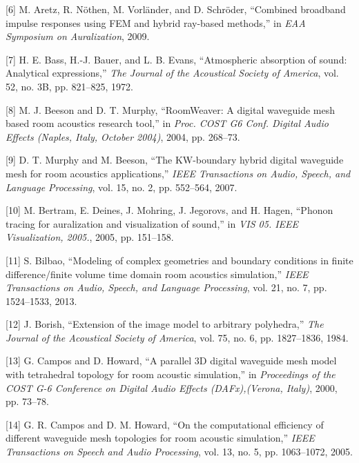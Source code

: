 \documentclass[]{scrreprt}
\begin{document}
\hypertarget{ref-aretzux5fcombinedux5f2009}{}
{[}6{]} M. Aretz, R. Nöthen, M. Vorländer, and D. Schröder, ``Combined
broadband impulse responses using FEM and hybrid ray-based methods,'' in
\emph{EAA Symposium on Auralization}, 2009.

\hypertarget{ref-bassux5fatmosphericux5f1972}{}
{[}7{]} H. E. Bass, H.-J. Bauer, and L. B. Evans, ``Atmospheric
absorption of sound: Analytical expressions,'' \emph{The Journal of the
Acoustical Society of America}, vol. 52, no. 3B, pp. 821--825, 1972.

\hypertarget{ref-beesonux5froomweaver:ux5f2004}{}
{[}8{]} M. J. Beeson and D. T. Murphy, ``RoomWeaver: A digital waveguide
mesh based room acoustics research tool,'' in \emph{Proc. COST G6 Conf.
Digital Audio Effects (Naples, Italy, October 2004)}, 2004, pp. 268--73.

\hypertarget{ref-murphyux5fkw-boundaryux5f2007}{}
{[}9{]} D. T. Murphy and M. Beeson, ``The KW-boundary hybrid digital
waveguide mesh for room acoustics applications,'' \emph{IEEE
Transactions on Audio, Speech, and Language Processing}, vol. 15, no. 2,
pp. 552--564, 2007.

\hypertarget{ref-bertramux5fphononux5f2005}{}
{[}10{]} M. Bertram, E. Deines, J. Mohring, J. Jegorovs, and H. Hagen,
``Phonon tracing for auralization and visualization of sound,'' in
\emph{VIS 05. IEEE Visualization, 2005.}, 2005, pp. 151--158.

\hypertarget{ref-bilbaoux5fmodelingux5f2013}{}
{[}11{]} S. Bilbao, ``Modeling of complex geometries and boundary
conditions in finite difference/finite volume time domain room acoustics
simulation,'' \emph{IEEE Transactions on Audio, Speech, and Language
Processing}, vol. 21, no. 7, pp. 1524--1533, 2013.

\hypertarget{ref-borishux5fextensionux5f1984}{}
{[}12{]} J. Borish, ``Extension of the image model to arbitrary
polyhedra,'' \emph{The Journal of the Acoustical Society of America},
vol. 75, no. 6, pp. 1827--1836, 1984.

\hypertarget{ref-camposux5fparallelux5f2000}{}
{[}13{]} G. Campos and D. Howard, ``A parallel 3D digital waveguide mesh
model with tetrahedral topology for room acoustic simulation,'' in
\emph{Proceedings of the COST G-6 Conference on Digital Audio Effects
(DAFx),(Verona, Italy)}, 2000, pp. 73--78.

\hypertarget{ref-camposux5fcomputationalux5f2005}{}
{[}14{]} G. R. Campos and D. M. Howard, ``On the computational
efficiency of different waveguide mesh topologies for room acoustic
simulation,'' \emph{IEEE Transactions on Speech and Audio Processing},
vol. 13, no. 5, pp. 1063--1072, 2005.
\end{document}
